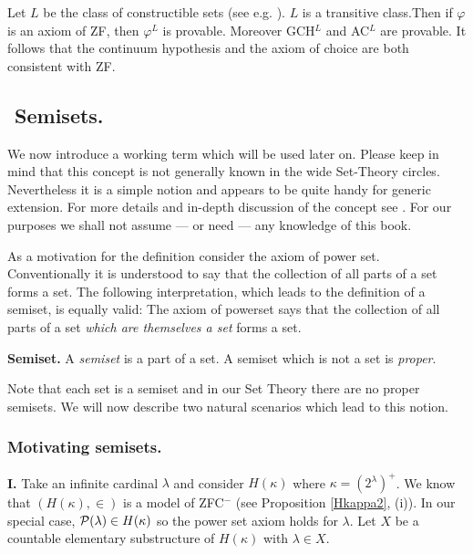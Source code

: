 \begin{example}[G\"{o}del] Let $L$ be the class of constructible sets (see e.g. \cite{JechST}).
$L$ is a transitive class.Then if $\varphi$ is an axiom of ZF, then $\varphi^L$ is provable.
Moreover GCH$^L$ and AC$^L$ are provable. It follows that the continuum hypothesis and the
axiom of choice are both consistent with ZF.
\end{example}

\subsection{${}$ \hspace{-1em}Semisets.}
We now introduce a working term which will be used later on.
Please keep in mind that this concept is not generally known in the wide
Set-Theory circles. Nevertheless it is a simple notion and appears to be quite handy for
generic extension. For more details and in-depth discussion of the concept
see \cite{VoHa:72}. For our purposes we shall not assume --- or need --- any
knowledge of this book.

As a motivation for the definition consider the axiom of power set.
Conventionally it is understood to say that the collection of all parts of a set
forms a set. The following interpretation, which leads to the definition of a
semiset, is equally valid: The axiom of powerset says that the collection of
all parts of a set \emph{which are themselves a set} forms a set.

\begin{definition}\label{semiset}
{\bf Semiset.} A \emph{semiset} is a part of a set. A semiset which is not
a set is \emph{proper}.
\end{definition}

Note that each set is a semiset and in our Set Theory there are no proper semisets.
We will now describe two natural scenarios which lead to this notion.


\subsubsection{Motivating semisets.}
{\bf I.} Take an infinite cardinal $\lambda$ and consider $H(\kappa)$ where
$\kappa= (2^\lambda)^+$. We know that
$(H(\kappa),\in)$ is a model of ZFC${}^-$ (see Proposition \ref{Hkappa2}, (i)).
In our special case,
${{\mathcal P}}(\lambda)\in H(\kappa)$ so the power set axiom holds for
$\lambda$. Let $X$ be a countable elementary substructure of $H(\kappa)$
with $\lambda\in X$.

